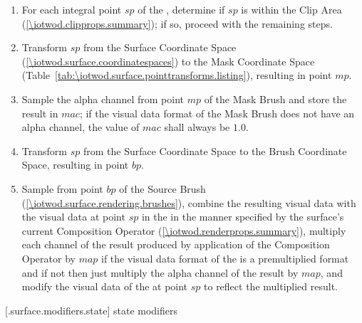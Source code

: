 \begin{enumerate}
\item For each integral point $sp$ of the \underlyingsurface, determine if $sp$ is within the Clip Area (\ref{\iotwod.clipprops.summary}); if so, proceed with the remaining steps.
\item Transform $sp$ from the Surface Coordinate Space (\ref{\iotwod.surface.coordinatespaces}) to the Mask Coordinate Space (Table~\ref{tab:\iotwod.surface.pointtransforms.listing}), resulting in point $mp$.
\item Sample the alpha channel from point $mp$ of the Mask Brush and store the result in $mac$; if the visual data format of the Mask Brush does not have an alpha channel, the value of $mac$ shall always be $1.0$.
\item Transform $sp$ from the Surface Coordinate Space to the Brush Coordinate Space, resulting in point $bp$.
\item Sample from point $bp$ of the Source Brush (\ref{\iotwod.surface.rendering.brushes}), combine the resulting visual data with the visual data at point $sp$ in the \underlyingsurface in the manner specified by the surface's current Composition Operator (\ref{\iotwod.renderprops.summary}), multiply each channel of the result produced by application of the Composition Operator by $map$ if the visual data format of the \underlyingsurface is a premultiplied format and if not then just multiply the alpha channel of the result by $map$, and modify the visual data of the \underlyingsurface at point $sp$ to reflect the multiplied result.
\end{enumerate}

 [\iotwod.surface.modifiers.state] { state modifiers}

